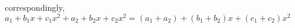\documentclass[preview]{standalone}
\begin{document}
\begin{center}
correspondingly, $a_1+b_1x+c_1x^2 + a_2+b_2x+c_2x^2 = (a_1+a_2) + (b_1+b_2)x + (c_1+c_2)x^2$
\end{center}
\end{document}
